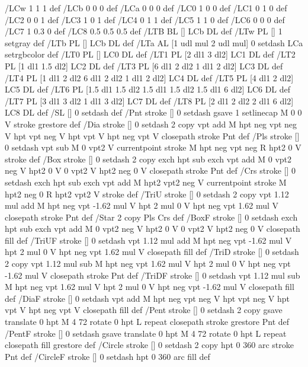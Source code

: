 /LCw {1 1 1} def
/LCb {0 0 0} def
/LCa {0 0 0} def
/LC0 {1 0 0} def
/LC1 {0 1 0} def
/LC2 {0 0 1} def
/LC3 {1 0 1} def
/LC4 {0 1 1} def
/LC5 {1 1 0} def
/LC6 {0 0 0} def
/LC7 {1 0.3 0} def
/LC8 {0.5 0.5 0.5} def
/LTB {BL [] LCb DL} def
/LTw {PL [] 1 setgray} def
/LTb {PL [] LCb DL} def
/LTa {AL [1 udl mul 2 udl mul] 0 setdash LCa setrgbcolor} def
/LT0 {PL [] LC0 DL} def
/LT1 {PL [2 dl1 3 dl2] LC1 DL} def
/LT2 {PL [1 dl1 1.5 dl2] LC2 DL} def
/LT3 {PL [6 dl1 2 dl2 1 dl1 2 dl2] LC3 DL} def
/LT4 {PL [1 dl1 2 dl2 6 dl1 2 dl2 1 dl1 2 dl2] LC4 DL} def
/LT5 {PL [4 dl1 2 dl2] LC5 DL} def
/LT6 {PL [1.5 dl1 1.5 dl2 1.5 dl1 1.5 dl2 1.5 dl1 6 dl2] LC6 DL} def
/LT7 {PL [3 dl1 3 dl2 1 dl1 3 dl2] LC7 DL} def
/LT8 {PL [2 dl1 2 dl2 2 dl1 6 dl2] LC8 DL} def
/SL {[] 0 setdash} def
/Pnt {stroke [] 0 setdash gsave 1 setlinecap M 0 0 V stroke grestore} def
/Dia {stroke [] 0 setdash 2 copy vpt add M
  hpt neg vpt neg V hpt vpt neg V
  hpt vpt V hpt neg vpt V closepath stroke
  Pnt} def
/Pls {stroke [] 0 setdash vpt sub M 0 vpt2 V
  currentpoint stroke M
  hpt neg vpt neg R hpt2 0 V stroke
 } def
/Box {stroke [] 0 setdash 2 copy exch hpt sub exch vpt add M
  0 vpt2 neg V hpt2 0 V 0 vpt2 V
  hpt2 neg 0 V closepath stroke
  Pnt} def
/Crs {stroke [] 0 setdash exch hpt sub exch vpt add M
  hpt2 vpt2 neg V currentpoint stroke M
  hpt2 neg 0 R hpt2 vpt2 V stroke} def
/TriU {stroke [] 0 setdash 2 copy vpt 1.12 mul add M
  hpt neg vpt -1.62 mul V
  hpt 2 mul 0 V
  hpt neg vpt 1.62 mul V closepath stroke
  Pnt} def
/Star {2 copy Pls Crs} def
/BoxF {stroke [] 0 setdash exch hpt sub exch vpt add M
  0 vpt2 neg V hpt2 0 V 0 vpt2 V
  hpt2 neg 0 V closepath fill} def
/TriUF {stroke [] 0 setdash vpt 1.12 mul add M
  hpt neg vpt -1.62 mul V
  hpt 2 mul 0 V
  hpt neg vpt 1.62 mul V closepath fill} def
/TriD {stroke [] 0 setdash 2 copy vpt 1.12 mul sub M
  hpt neg vpt 1.62 mul V
  hpt 2 mul 0 V
  hpt neg vpt -1.62 mul V closepath stroke
  Pnt} def
/TriDF {stroke [] 0 setdash vpt 1.12 mul sub M
  hpt neg vpt 1.62 mul V
  hpt 2 mul 0 V
  hpt neg vpt -1.62 mul V closepath fill} def
/DiaF {stroke [] 0 setdash vpt add M
  hpt neg vpt neg V hpt vpt neg V
  hpt vpt V hpt neg vpt V closepath fill} def
/Pent {stroke [] 0 setdash 2 copy gsave
  translate 0 hpt M 4 {72 rotate 0 hpt L} repeat
  closepath stroke grestore Pnt} def
/PentF {stroke [] 0 setdash gsave
  translate 0 hpt M 4 {72 rotate 0 hpt L} repeat
  closepath fill grestore} def
/Circle {stroke [] 0 setdash 2 copy
  hpt 0 360 arc stroke Pnt} def
/CircleF {stroke [] 0 setdash hpt 0 360 arc fill} def

